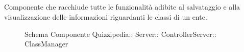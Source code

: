 \subsection{}
Componente che racchiude tutte le funzionalità adibite al salvataggio e alla visualizzazione delle informazioni riguardanti le classi di un ente.
\begin{figure}[H]
\centering
\noindent{}
\caption[Schema Componente ClassManager]{Schema Componente Quizzipedia:: Server:: ControllerServer:: ClassManager}
\end{figure}
